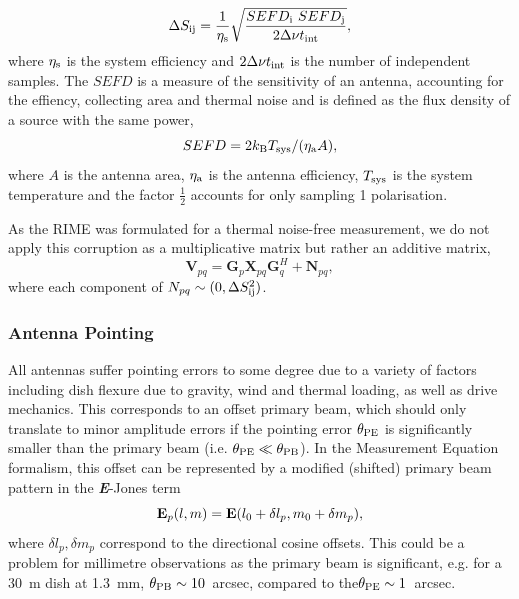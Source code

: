 \begin{equation}
 \Delta S_{\rm ij} = \frac{1}{\eta_{\rm s}}\sqrt{\frac{SEFD_{\rm i}\ SEFD_{\rm j}}{2 \Delta \nu t_{\rm int}}},  
\end{equation}
where $\eta_{\rm s}$ is the system efficiency and $2 \Delta \nu t_{\rm int}$ is the number of independent samples. The $SEFD$ is a measure of the sensitivity of an antenna, accounting for the effiency, collecting area and thermal noise and is defined as the flux density of a source with the same power,
\begin{equation}
 SEFD = 2 k_{\rm B} T_{\rm sys} / (\eta_{\rm a} A),
\end{equation}
where $A$ is the antenna area, $\eta_{\rm a}$ is the antenna efficiency, $T_{\rm sys}$ is the system temperature and the factor $\frac{1}{2}$ accounts for only sampling 1 polarisation.


As the RIME was formulated for a thermal noise-free measurement, we do not apply this corruption as a multiplicative matrix but rather an additive matrix,
\begin{equation}\label{eq:noise_matrix}
\bm{V}_{pq} = \bm G_p \bm{X}_{pq} \bm G_q^H + \bm N_{pq},
\end{equation}
where each component of $N_{pq} \sim (0, \Delta S_{\rm ij}^2)$.


\subsubsection{Antenna Pointing}
All antennas suffer pointing errors to some degree due to a variety of factors including dish flexure due to gravity, wind and thermal loading, as well as drive mechanics. This corresponds to an offset primary beam, which should only translate to minor amplitude errors if the pointing error $\theta_{\rm PE}$ is significantly smaller than the primary beam (i.e. $\theta_{\rm PE} \ll \theta_{\rm PB}$). In the Measurement Equation formalism, this offset can be represented by a modified (shifted) primary beam pattern in the {\bf \it E}-Jones term 
\begin{equation}
{\bf E}_p(l,m) = {\bf E}(l_0 + \delta l_p, m_0 + \delta m_p),
\end{equation}
where $\delta l_p, \delta m_p$ correspond to the directional cosine offsets.
This could be a problem for millimetre observations as the primary beam is significant, e.g. for a 30~m dish at 1.3~mm, $\theta_{\rm PB} \sim 10$~arcsec, compared to the$\theta_{\rm PE} \sim 1$~arcsec.


